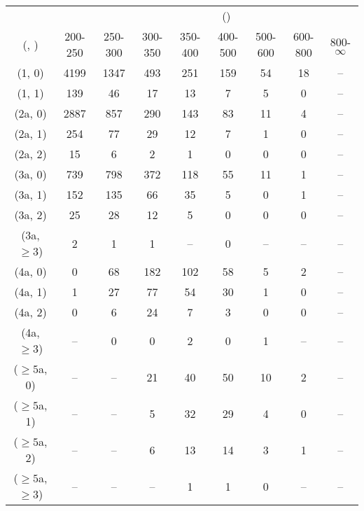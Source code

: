 \begin{table}[h!]
\tiny
\centering
{}
\begin{tabular}
{ccccccccc}
	\hline\hline
&	& \multicolumn{8}{c}{\scalht (\gev)} \\ 
	 (\njet,  \nb) & 200-250 & 250-300 & 300-350 & 350-400 & 400-500 & 500-600 & 600-800 & 800-$\infty$ \\ [0.8ex] 
\hline
	(1, 0) & 4199 & 1347 & 493 & 251 & 159 & 54 & 18 & -- \\[0.5ex] 
	(1, 1) & 139 & 46 & 17 & 13 & 7 & 5 & 0 & -- \\[0.5ex] 
	(2a, 0) & 2887 & 857 & 290 & 143 & 83 & 11 & 4 & -- \\[0.5ex] 
	(2a, 1) & 254 & 77 & 29 & 12 & 7 & 1 & 0 & -- \\[0.5ex] 
	(2a, 2) & 15 & 6 & 2 & 1 & 0 & 0 & 0 & -- \\[0.5ex] 
	(3a, 0) & 739 & 798 & 372 & 118 & 55 & 11 & 1 & -- \\[0.5ex] 
	(3a, 1) & 152 & 135 & 66 & 35 & 5 & 0 & 1 & -- \\[0.5ex] 
	(3a, 2) & 25 & 28 & 12 & 5 & 0 & 0 & 0 & -- \\[0.5ex] 
	(3a, $\ge3$) & 2 & 1 & 1 & -- & 0 & -- & -- & -- \\[0.5ex] 
	(4a, 0) & 0 & 68 & 182 & 102 & 58 & 5 & 2 & -- \\[0.5ex] 
	(4a, 1) & 1 & 27 & 77 & 54 & 30 & 1 & 0 & -- \\[0.5ex] 
	(4a, 2) & 0 & 6 & 24 & 7 & 3 & 0 & 0 & -- \\[0.5ex] 
	(4a, $\ge3$) & -- & 0 & 0 & 2 & 0 & 1 & -- & -- \\[0.5ex] 
	($\ge5$a, 0) & -- & -- & 21 & 40 & 50 & 10 & 2 & -- \\[0.5ex] 
	($\ge5$a, 1) & -- & -- & 5 & 32 & 29 & 4 & 0 & -- \\[0.5ex] 
	($\ge5$a, 2) & -- & -- & 6 & 13 & 14 & 3 & 1 & -- \\[0.5ex] 
	($\ge5$a, $\ge3$) & -- & -- & -- & 1 & 1 & 0 & -- & -- \\[0.5ex] 
	\hline
	\hline
\end{tabular}
\end{table}
